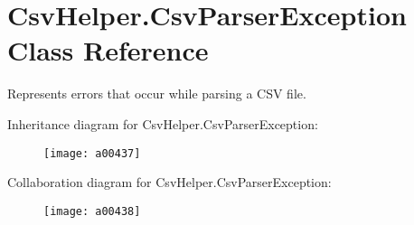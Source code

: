 \hypertarget{a00071}{\section{Csv\-Helper.\-Csv\-Parser\-Exception Class Reference}
\label{a00071}
}


Represents errors that occur while parsing a C\-S\-V file.  




Inheritance diagram for Csv\-Helper.\-Csv\-Parser\-Exception\-:
\nopagebreak
\begin{figure}[H]
\begin{center}
\leavevmode
\texttt{[image: a00437]}
\end{center}
\end{figure}


Collaboration diagram for Csv\-Helper.\-Csv\-Parser\-Exception\-:
\nopagebreak
\begin{figure}[H]
\begin{center}
\leavevmode
\texttt{[image: a00438]}
\end{center}
\end{figure}

